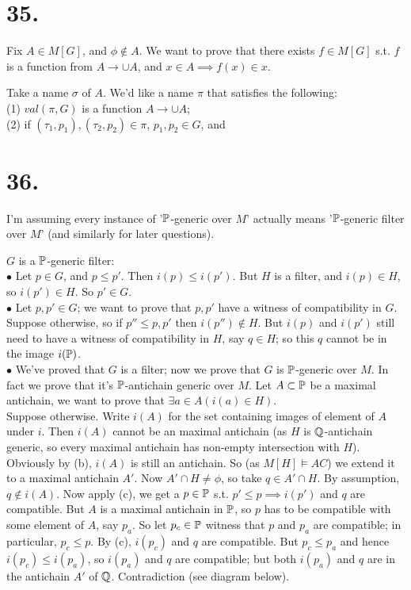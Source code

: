 \documentclass[a4paper]{article}
\begin{document}
\section*{35.}
Fix $A \in M[G]$, and $\phi \not\in A$. We want to prove that there exists $f \in M[G]$ s.t. $f$ is a function from $A \to \cup A$, and $x \in A \implies f(x) \in x$.

Take a name $\sigma$ of $A$. We'd like a name $\pi$ that satisfies the following:\\
(1) $val(\pi,G)$ is a function $A \to \cup A$;\\
(2) if $(\tau_1,p_1),(\tau_2,p_2) \in \pi$, $p_1,p_2 \in G$, and

\section*{36.}
I'm assuming every instance of '$\P$-generic over $M$' actually means '$\P$-generic filter over $M$' (and similarly for later questions).

$G$ is a $\P$-generic filter:\\
$\bullet$ Let $p \in G$, and $p \leq p'$. Then $i(p) \leq i(p')$. But $H$ is a filter, and $i(p) \in H$, so $i(p') \in H$. So $p' \in G$.\\
$\bullet$ Let $p,p' \in G$; we want to prove that $p,p'$ have a witness of compatibility in $G$. Suppose otherwise, so if $p'' \leq p,p'$ then $i(p'') \not\in H$. But $i(p)$ and $i(p')$ still need 
to have a witness of compatibility in $H$, say $q \in H$; so this $q$ cannot be in the image $i(\P)$.\\
$\bullet$ We've proved that $G$ is a filter; now we prove that $G$ is $\P$-generic over $M$. In fact we prove that it's $\P$-antichain generic over $M$. Let $A \subset \P$ be a maximal antichain, we want to prove that $\exists a \in A (i(a) \in H)$.\\
Suppose otherwise. Write $i(A)$ for the set containing images of element of $A$ under $i$. Then $i(A)$ cannot be an maximal antichain (as $H$ is $\Q$-antichain generic, so every maximal antichain has non-empty intersection with $H$). Obviously by (b), $i(A)$ is still an antichain. So (as $M[H] \vDash AC$) we extend it to a maximal antichain $A'$. Now $A' \cap H \neq \phi$, so take $q \in A' \cap H$. By assumption, $q \not\in i(A)$. Now apply (c), we get a $p \in \P$ s.t. $p' \leq p \implies i(p')$ and $q$ are compatible. But $A$ is a maximal antichain in $\P$, so $p$ has to be compatible with some element of $A$, say $p_a$. So let $p_c \in \P$ witness that $p$ and $p_a$ are compatible; in particular, $p_c \leq p$. By (c), $i(p_c)$ and $q$ are compatible. But $p_c \leq p_a$ and hence $i(p_c) \leq i(p_a)$, so $i(p_a)$ and $q$ are compatible; but both $i(p_a)$ and $q$ are in the antichain $A'$ of $\Q$. Contradiction (see diagram below).
\end{document}
